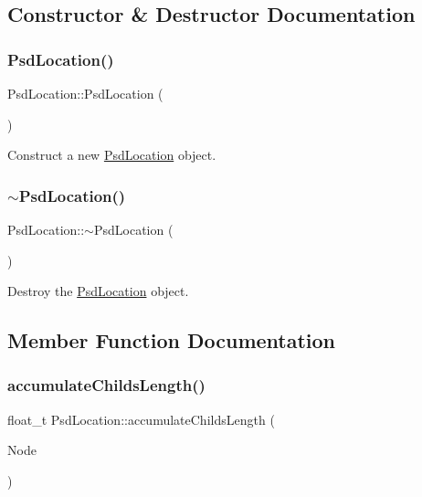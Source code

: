 \subsection{Constructor \& Destructor Documentation}
\mbox{\label{class_psd_location_a6d89a3bd03a7fe9af26fc08d446bfd24}} 
\subsubsection{\texorpdfstring{Psd\+Location()}{PsdLocation()}}
{\footnotesize\ttfamily Psd\+Location\+::\+Psd\+Location (\begin{DoxyParamCaption}{ }\end{DoxyParamCaption})}



Construct a new \hyperlink{class_psd_location}{Psd\+Location} object. 

\mbox{\label{class_psd_location_ad8df0c3ca51c9df077060c1f8209d977}} 
\subsubsection{\texorpdfstring{$\sim$\+Psd\+Location()}{~PsdLocation()}}
{\footnotesize\ttfamily Psd\+Location\+::$\sim$\+Psd\+Location (\begin{DoxyParamCaption}{ }\end{DoxyParamCaption})}



Destroy the \hyperlink{class_psd_location}{Psd\+Location} object. 



\subsection{Member Function Documentation}
\mbox{\label{class_psd_location_a672da471bdc922005cfe26bfaa4315f8}} 
\subsubsection{\texorpdfstring{accumulate\+Childs\+Length()}{accumulateChildsLength()}}
{\footnotesize\ttfamily float\+\_\+t Psd\+Location\+::accumulate\+Childs\+Length (\begin{DoxyParamCaption}\item[{struct \hyperlink{struct_tree_node}{Tree\+Node} $\ast$}]{Node }\end{DoxyParamCaption})}



